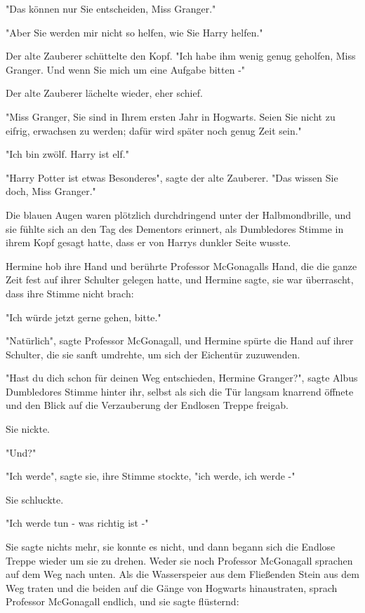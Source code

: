 {"Das können nur Sie entscheiden, Miss Granger."

"Aber Sie werden mir nicht so helfen, wie Sie Harry helfen."

Der alte Zauberer schüttelte den Kopf. "Ich habe ihm wenig genug geholfen, Miss Granger. Und wenn Sie mich um eine Aufgabe bitten -"

Der alte Zauberer lächelte wieder, eher schief.

"Miss Granger, Sie sind in Ihrem ersten Jahr in Hogwarts. Seien Sie nicht zu eifrig, erwachsen zu werden; dafür wird später noch genug Zeit sein."

"Ich bin zwölf. Harry ist elf."

"Harry Potter ist etwas Besonderes", sagte der alte Zauberer. "Das wissen Sie doch, Miss Granger."

Die blauen Augen waren plötzlich durchdringend unter der Halbmondbrille, und sie fühlte sich an den Tag des Dementors erinnert, als Dumbledores Stimme in ihrem Kopf gesagt hatte, dass er von Harrys dunkler Seite wusste.

Hermine hob ihre Hand und berührte Professor McGonagalls Hand, die die ganze Zeit fest auf ihrer Schulter gelegen hatte, und Hermine sagte, sie war überrascht, dass ihre Stimme nicht brach:

"Ich würde jetzt gerne gehen, bitte."

"Natürlich", sagte Professor McGonagall, und Hermine spürte die Hand auf ihrer Schulter, die sie sanft umdrehte, um sich der Eichentür zuzuwenden.

"Hast du dich schon für deinen Weg entschieden, Hermine Granger?", sagte Albus Dumbledores Stimme hinter ihr, selbst als sich die Tür langsam knarrend öffnete und den Blick auf die Verzauberung der Endlosen Treppe freigab.

Sie nickte.

"Und?"

"Ich werde", sagte sie, ihre Stimme stockte, "ich werde, ich werde -"

Sie schluckte.

"Ich werde tun - was richtig ist -"

Sie sagte nichts mehr, sie konnte es nicht, und dann begann sich die Endlose Treppe wieder um sie zu drehen. Weder sie noch Professor McGonagall sprachen auf dem Weg nach unten. Als die Wasserspeier aus dem Fließenden Stein aus dem Weg traten und die beiden auf die Gänge von Hogwarts hinaustraten, sprach Professor McGonagall endlich, und sie sagte flüsternd:

}
